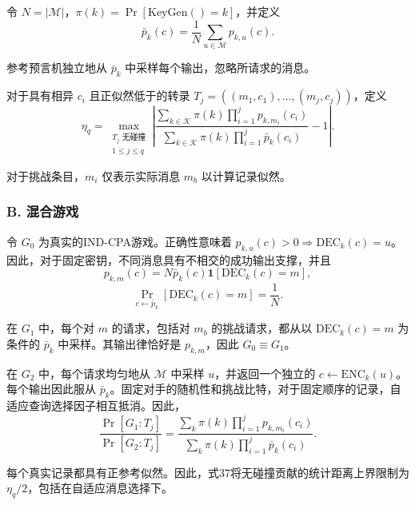 令 \(N = |\mathcal{M}|\)，\(\pi(k) = \Pr[\mathrm{KeyGen}() = k]\)，并定义
\begin{equation}
\bar{p}_k(c) = \frac{1}{N} \sum_{u \in \mathcal{M}} p_{k,u}(c). \tag{36}
\end{equation}

参考预言机独立地从 \(\bar{p}_k\) 中采样每个输出，忽略所请求的消息。

对于具有相异 \(c_i\) 且正似然低于的转录 \(T_j = ((m_1, c_1), \ldots, (m_j, c_j))\)，定义
\begin{equation}
\eta_q = \max_{\substack{T_j \text{ 无碰撞} \\ 1 \le j \le q}} \left| \frac{\sum_{k \in \mathcal{K}} \pi(k) \prod_{i=1}^j p_{k,m_i}(c_i)}{\sum_{k \in \mathcal{K}} \pi(k) \prod_{i=1}^j \bar{p}_k(c_i)} - 1 \right|. \tag{37}
\end{equation}

对于挑战条目，\(m_i\) 仅表示实际消息 \(m_b\) 以计算记录似然。

\subsubsection*{B. 混合游戏}

令 \(G_0\) 为真实的IND-CPA游戏。正确性意味着 \(p_{k,u}(c) > 0 \Rightarrow \mathrm{DEC}_k(c) = u\)。因此，对于固定密钥，不同消息具有不相交的成功输出支撑，并且
\begin{equation}
p_{k,m}(c) = N \bar{p}_k(c) \mathbf{1}[\mathrm{DEC}_k(c) = m],
\end{equation}
\begin{equation}
\Pr_{c \leftarrow \bar{p}_k} [\mathrm{DEC}_k(c) = m] = \frac{1}{N}. \tag{38}
\end{equation}

在 \(G_1\) 中，每个对 \(m\) 的请求，包括对 \(m_b\) 的挑战请求，都从以 \(\mathrm{DEC}_k(c) = m\) 为条件的 \(\bar{p}_k\) 中采样。其输出律恰好是 \(p_{k,m}\)，因此 \(G_0 \equiv G_1\)。

在 \(G_2\) 中，每个请求均匀地从 \(\mathcal{M}\) 中采样 \(u\)，并返回一个独立的 \(c \leftarrow \mathrm{ENC}_k(u)\)。每个输出因此服从 \(\bar{p}_k\)。固定对手的随机性和挑战比特，对于固定顺序的记录，自适应查询选择因子相互抵消。因此，
\begin{equation}
\frac{\Pr[G_1 : T_j]}{\Pr[G_2 : T_j]} = \frac{\sum_k \pi(k) \prod_{i=1}^j p_{k,m_i}(c_i)}{\sum_k \pi(k) \prod_{i=1}^j \bar{p}_k(c_i)}. \tag{39}
\end{equation}

每个真实记录都具有正参考似然。因此，式37将无碰撞贡献的统计距离上界限制为 \(\eta_q/2\)，包括在自适应消息选择下。

